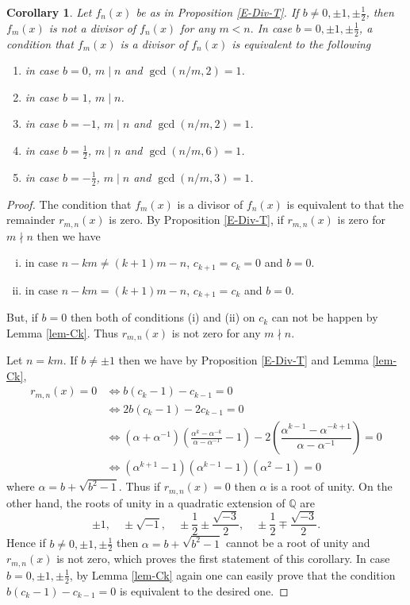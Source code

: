 \documentclass[a4paper, 11pt]{amsart}
\numberwithin{equation}{section}
\newtheorem{cor}[thm]{Corollary}
\theoremstyle{definition}
\newcommand{\Q}{\mathbb{Q}}
\begin{document}
\begin{cor}\label{Div-T}
Let $f_n(x)$ be as in Proposition \ref{E-Div-T}.
If $b\neq 0,\pm1, \pm \frac12$, then $f_m(x)$ is not a divisor of $f_n(x)$ for any $m<n.$
In case $b=0, \pm 1, \pm \frac12$, a condition that $f_m(x)$ is a divisor of $f_n(x)$ is equivalent to
the following
\begin{enumerate}[{\rm (1)}]
\item
in case $b=0$, $m\mid n$ and $\gcd(n/m, 2)=1$.
\item
in case $b=1$, $m\mid n$.
\item
in case $b=-1$, $m\mid n$ and $\gcd(n/m, 2)=1$.
\item
in case $b=\frac12$, $m\mid n$ and $\gcd(n/m, 6)=1$.
\item
in case $b=-\frac12$, $m\mid n$ and $\gcd(n/m, 3)=1$.
\end{enumerate}
\end{cor}

\begin{proof}
The condition that $f_m(x)$ is a divisor of $f_n(x)$ is equivalent to that the remainder $r_{m,n}(x)$ is zero.
By Proposition \ref{E-Div-T}, if $r_{m,n}(x)$ is zero for $m\nmid n$ then we have
\begin{enumerate}[(i)]
\item
in case $n-km\neq (k+1)m-n$, $c_{k+1}=c_k=0$ and $b=0$.
\item
in case $n-km=(k+1)m-n$, $c_{k+1}=c_k$ and $b=0$.
\end{enumerate}
But, if $b=0$ then both of conditions (i) and (ii) on $c_k$ can not be happen by Lemma \ref{lem-Ck}.
Thus $r_{m,n}(x)$ is not zero for any $m\nmid n$.

Let $n=km$.
If $b\neq \pm1$ then we have by Proposition \ref{E-Div-T} and Lemma \ref{lem-Ck}, 
\begin{align*}
r_{m,n}(x)=0
&\iff 
b(c_k-1)-c_{k-1}=0\\
&\iff 
2b(c_k-1)-2c_{k-1}=0\\
&\iff 
(\alpha+\alpha^{-1})\left(\frac{\alpha^k-\alpha^{-k}}{\alpha-\alpha^{-1}}-1\right)-2\left(\dfrac{\alpha^{k-1}-\alpha^{-k+1}}{\alpha-\alpha^{-1}}\right)=0\\
&\iff 
(\alpha^{k+1}-1)(\alpha^{k-1}-1)(\alpha^2-1)=0
\end{align*}
where $\alpha=b+\sqrt{b^2-1}$.
Thus if $r_{m,n}(x)=0$ then $\alpha$ is a root of unity.
On the other hand, the roots of unity in a quadratic extension of $\Q$ are 
\[
\pm1, \quad \pm \sqrt{-1}, \quad\pm \frac12\pm \frac{\sqrt{-3}}2, \quad \pm \frac12\mp \frac{\sqrt{-3}}2.
\]
Hence if $b\neq 0,\pm 1, \pm\frac12$ then $\alpha=b+\sqrt{b^2-1}$ cannot be a root of unity and $r_{m,n}(x)$ is not zero, which proves the first statement of this corollary.
In case $b=0,\pm 1, \pm\frac12$, by Lemma \ref{lem-Ck} again one can easily prove that the condition $b(c_k-1)-c_{k-1}=0$ is equivalent to the desired one.
\end{proof}
\end{document}

